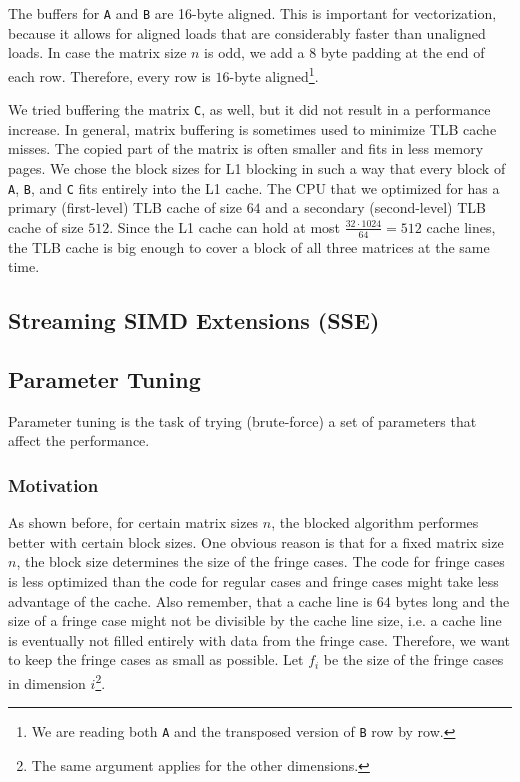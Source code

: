 \documentclass[12pt]{article}
\begin{document}
The buffers for \lstinline{A} and \lstinline{B} are 16-byte aligned. This is important for vectorization, because it allows for aligned loads that are considerably faster than unaligned loads. In case the matrix size $n$ is odd, we add a $8$ byte padding at the end of each row. Therefore, every row is $16$-byte aligned\footnote{We are reading both \lstinline{A} and the transposed version of \lstinline{B} row by row.}.

We tried buffering the matrix \lstinline{C}, as well, but it did not result in a performance increase. In general, matrix buffering is sometimes used to minimize TLB cache misses. The copied part of the matrix is often smaller and fits in less memory pages. We chose the block sizes for L1 blocking in such a way that every block of \lstinline{A}, \lstinline{B}, and \lstinline{C} fits entirely into the L1 cache. The CPU that we optimized for has a primary (first-level) TLB cache of size $64$ and a secondary (second-level) TLB cache of size $512$. Since the L1 cache can hold at most $\frac{32 \cdot 1024}{64} = 512$ cache lines, the TLB cache is big enough to cover a block of all three matrices at the same time.

\subsection{Streaming SIMD Extensions (SSE)}

\subsection{Parameter Tuning}
Parameter tuning is the task of trying (brute-force) a set of parameters that affect the performance.

\subsubsection{Motivation}
As shown before, for certain matrix sizes $n$, the blocked algorithm performes better with certain block sizes. One obvious reason is that for a fixed matrix size $n$, the block size determines the size of the fringe cases. The code for fringe cases is less optimized than the code for regular cases and fringe cases might take less advantage of the cache. Also remember, that a cache line is $64$ bytes long and the size of a fringe case might not be divisible by the cache line size, i.e. a cache line is eventually not filled entirely with data from the fringe case. Therefore, we want to keep the fringe cases as small as possible. Let $f_i$ be the size of the fringe cases in dimension $i$\footnote{The same argument applies for the other dimensions.}. 
\end{document}

